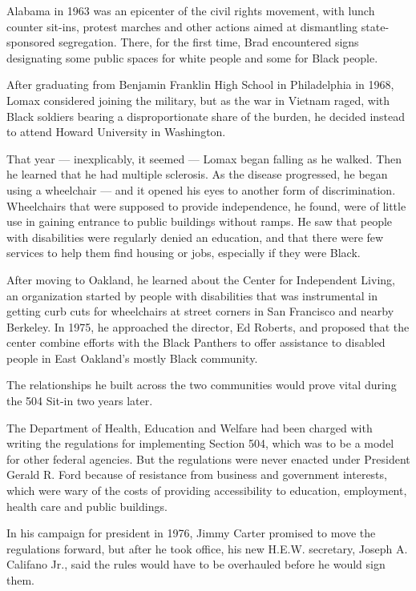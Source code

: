 Alabama in 1963 was an epicenter of the civil rights movement, with
lunch counter sit-ins, protest marches and other actions aimed at
dismantling state-sponsored segregation. There, for the first time, Brad
encountered signs designating some public spaces for white people and
some for Black people.

After graduating from Benjamin Franklin High School in Philadelphia in
1968, Lomax considered joining the military, but as the war in Vietnam
raged, with Black soldiers bearing a disproportionate share of the
burden, he decided instead to attend Howard University in Washington.

That year --- inexplicably, it seemed --- Lomax began falling as he
walked. Then he learned that he had multiple sclerosis. As the disease
progressed, he began using a wheelchair --- and it opened his eyes to
another form of discrimination. Wheelchairs that were supposed to
provide independence, he found, were of little use in gaining entrance
to public buildings without ramps. He saw that people with disabilities
were regularly denied an education, and that there were few services to
help them find housing or jobs, especially if they were Black.

After moving to Oakland, he learned about the Center for Independent
Living, an organization started by people with disabilities that was
instrumental in getting curb cuts for wheelchairs at street corners in
San Francisco and nearby Berkeley. In 1975, he approached the director,
Ed Roberts, and proposed that the center combine efforts with the Black
Panthers to offer assistance to disabled people in East Oakland's mostly
Black community.

The relationships he built across the two communities would prove vital
during the 504 Sit-in two years later.

The Department of Health, Education and Welfare had been charged with
writing the regulations for implementing Section 504, which was to be a
model for other federal agencies. But the regulations were never enacted
under President Gerald R. Ford because of resistance from business and
government interests, which were wary of the costs of providing
accessibility to education, employment, health care and public
buildings.

In his campaign for president in 1976, Jimmy Carter promised to move the
regulations forward, but after he took office, his new H.E.W. secretary,
Joseph A. Califano Jr., said the rules would have to be overhauled
before he would sign them.

